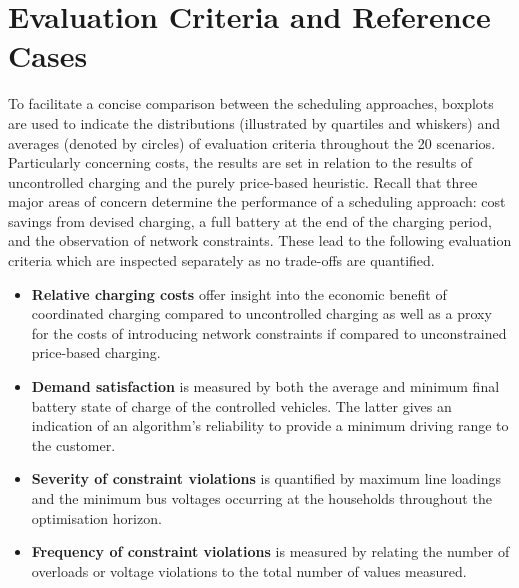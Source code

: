 \section{Evaluation Criteria and Reference Cases}
\label{sec:ec}

To facilitate a concise comparison between the scheduling approaches, boxplots are used to indicate the distributions (illustrated by quartiles and whiskers) and averages (denoted by circles) of evaluation criteria throughout the 20 scenarios. Particularly concerning costs, the results are set in relation to the results of uncontrolled charging and the purely price-based heuristic. Recall that three major areas of concern determine the performance of a scheduling approach: cost savings from devised charging, a full battery at the end of the charging period, and the observation of network constraints. These lead to the following evaluation criteria which are inspected separately as no trade-offs are quantified.

\begin{itemize}
	\item \textbf{Relative charging costs} offer insight into the economic benefit of coordinated charging compared to uncontrolled charging as well as a proxy for the costs of introducing network constraints if compared to unconstrained price-based charging.
	\item \textbf{Demand satisfaction} is measured by both the average and minimum final battery state of charge of the controlled vehicles. The latter gives an indication of an algorithm's reliability to provide a minimum driving range to the customer.
	\item \textbf{Severity of constraint violations} is quantified by maximum line loadings and the minimum bus voltages occurring at the households throughout the optimisation horizon.
	\item \textbf{Frequency of constraint violations} is measured by relating the number of overloads or voltage violations to the total number of values measured.
\end{itemize}

